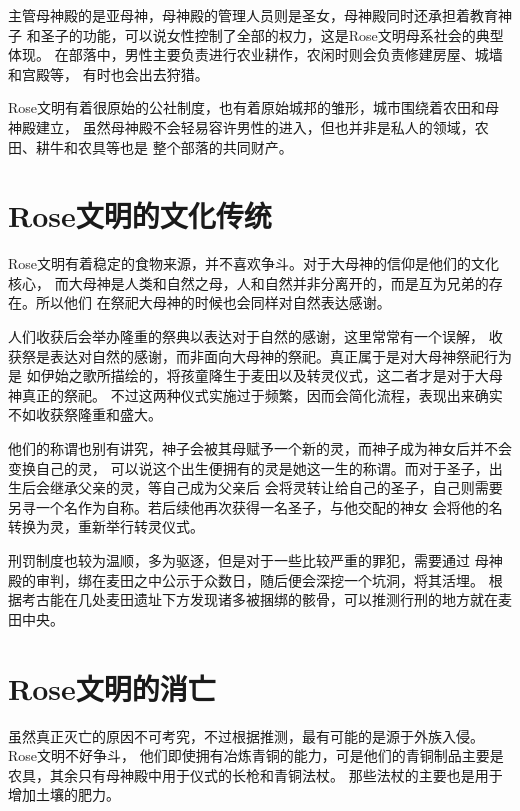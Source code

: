 \documentclass[UTF8,12pt]{ctexbook}
\begin{document}
            主管母神殿的是亚母神，母神殿的管理人员则是圣女，母神殿同时还承担着教育神子
            和圣子的功能，可以说女性控制了全部的权力，这是Rose文明母系社会的典型体现。
            在部落中，男性主要负责进行农业耕作，农闲时则会负责修建房屋、城墙和宫殿等，
            有时也会出去狩猎。

            Rose文明有着很原始的公社制度，也有着原始城邦的雏形，城市围绕着农田和母神殿建立，
            虽然母神殿不会轻易容许男性的进入，但也并非是私人的领域，农田、耕牛和农具等也是
            整个部落的共同财产。

        \section{Rose文明的文化传统}
            Rose文明有着稳定的食物来源，并不喜欢争斗。对于大母神的信仰是他们的文化核心，
            而大母神是人类和自然之母，人和自然并非分离开的，而是互为兄弟的存在。所以他们
            在祭祀大母神的时候也会同样对自然表达感谢。
            
            人们收获后会举办隆重的祭典以表达对于自然的感谢，这里常常有一个误解，
            收获祭是表达对自然的感谢，而非面向大母神的祭祀。真正属于是对大母神祭祀行为是
            如伊始之歌所描绘的，将孩童降生于麦田以及转灵仪式，这二者才是对于大母神真正的祭祀。
            不过这两种仪式实施过于频繁，因而会简化流程，表现出来确实不如收获祭隆重和盛大。

            他们的称谓也别有讲究，神子会被其母赋予一个新的灵，而神子成为神女后并不会变换自己的灵，
            可以说这个出生便拥有的灵是她这一生的称谓。而对于圣子，出生后会继承父亲的灵，等自己成为父亲后
            会将灵转让给自己的圣子，自己则需要另寻一个名作为自称。若后续他再次获得一名圣子，与他交配的神女
            会将他的名转换为灵，重新举行转灵仪式。

            刑罚制度也较为温顺，多为驱逐，但是对于一些比较严重的罪犯，需要通过
            母神殿的审判，绑在麦田之中公示于众数日，随后便会深挖一个坑洞，将其活埋。
            根据考古能在几处麦田遗址下方发现诸多被捆绑的骸骨，可以推测行刑的地方就在麦田中央。

        \section{Rose文明的消亡}
            虽然真正灭亡的原因不可考究，不过根据推测，最有可能的是源于外族入侵。Rose文明不好争斗，
            他们即使拥有冶炼青铜的能力，可是他们的青铜制品主要是农具，其余只有母神殿中用于仪式的长枪和青铜法杖。
            那些法杖的主要也是用于增加土壤的肥力。
\end{document}
